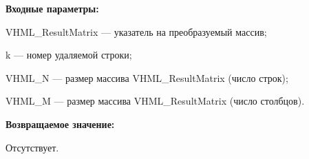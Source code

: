 \textbf{Входные параметры:}  
 
VHML\_ResultMatrix --- указатель на преобразуемый массив;
 
k --- номер удаляемой строки;
 
VHML\_N --- размер массива VHML\_ResultMatrix (число строк);
 
VHML\_M --- размер массива VHML\_ResultMatrix (число столбцов).

\textbf{Возвращаемое значение:}

Отсутствует.